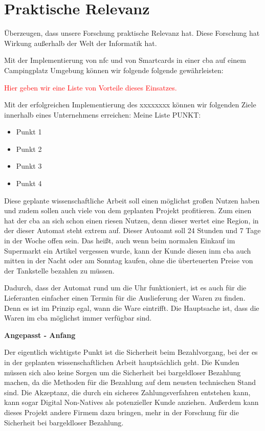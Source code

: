 \section{Praktische Relevanz}

Überzeugen, dass unsere Forschung praktische Relevanz hat. Diese Forschung hat Wirkung außerhalb der
Welt der Informatik hat.

Mit der Implementierung von \acrshort{nfc} und von Smartcards in einer \acrlong{cba} auf einem Campingplatz Umgebung können
wir folgende folgende gewährleisten:

\textcolor{red}{Hier geben wir eine Liste von Vorteile dieses Einsatzes.}


Mit der erfolgreichen Implementierung des xxxxxxxx können wir folgenden Ziele innerhalb eines Unternehmens erreichen:
Meine Liste PUNKT:
\begin{itemize}
    \item Punkt 1
    \item Punkt 2
    \item Punkt 3
    \item Punkt 4
\end{itemize}


Diese geplante wissenschaftliche Arbeit soll einen möglichst großen Nutzen haben und zudem sollen auch viele von dem geplanten 
Projekt profitieren. Zum einen hat der \acrfull{cba} an sich schon einen riesen Nutzen, denn dieser wertet eine Region, in der
dieser Automat steht extrem auf. Dieser Autoamt soll 24 Stunden und 7 Tage in der Woche offen sein. Das heißt, auch wenn beim
normalen Einkauf im Supermarkt ein Artikel vergessen wurde, kann der Kunde diesen inm \acrfull{cba} auch mitten in der Nacht 
oder am Sonntag kaufen, ohne die überteuerten Preise von der Tankstelle bezahlen zu müssen. 

Dadurch, dass der Automat rund um die Uhr funktioniert, ist es auch für die Lieferanten einfacher einen Termin für die Auslieferung 
der Waren zu finden. Denn es ist im Prinzip egal, wann die Ware eintrifft. Die Hauptsache ist, dass die Waren im \acrfull{cba}
möglichst immer verfügbar sind. 

\textbf{Angepasst - Anfang}

Der eigentlich wichtigste Punkt ist die Sicherheit beim Bezahlvorgang, bei der es in der geplanten wissenschaftlichen Arbeit 
hauptsächlich geht. Die Kunden müssen sich also keine Sorgen um die Sicherheit bei bargeldloser Bezahlung machen, da die Methoden 
für die Bezahlung auf dem neusten technischen Stand sind. Die Akzeptanz, die durch ein sicheres Zahlungsverfahren entstehen kann, 
kann sogar Digital Non-Natives als potenzieller Kunde anziehen. Außerdem kann dieses Projekt andere Firmem dazu bringen, mehr
in der Forschung für die Sicherheit bei bargeldloser Bezahlung.

